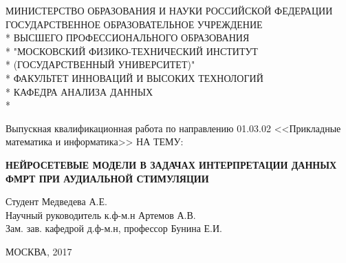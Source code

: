 \documentclass[pdftex,ptm,12pt,a4paper]{report}
\theoremstyle{definition}
\begin{document}
\begin{titlepage}
\newpage

\begin{center}
МИНИСТЕРСТВО ОБРАЗОВАНИЯ И НАУКИ РОССИЙСКОЙ ФЕДЕРАЦИИ \\
\vspace{0.5cm}
ГОСУДАРСТВЕННОЕ ОБРАЗОВАТЕЛЬНОЕ УЧРЕЖДЕНИЕ \\*
ВЫСШЕГО ПРОФЕССИОНАЛЬНОГО ОБРАЗОВАНИЯ\\*
"МОСКОВСКИЙ ФИЗИКО-ТЕХНИЧЕСКИЙ ИНСТИТУТ \\*
(ГОСУДАРСТВЕННЫЙ УНИВЕРСИТЕТ)" \\*
\vspace{0.5cm}
ФАКУЛЬТЕТ ИННОВАЦИЙ И ВЫСОКИХ ТЕХНОЛОГИЙ \\*
КАФЕДРА АНАЛИЗА ДАННЫХ \\*
\hrulefill
\end{center}


\vspace{8em}

\begin{center}
\Large Выпускная квалификационная работа по направлению 01.03.02 <<Прикладные математика и информатика>> \linebreak НА ТЕМУ:
\end{center}

\vspace{2.5em}

\begin{center}
\textsc{\large{\textbf{НЕЙРОСЕТЕВЫЕ МОДЕЛИ В ЗАДАЧАХ ИНТЕРПРЕТАЦИИ ДАННЫХ ФМРТ ПРИ АУДИАЛЬНОЙ СТИМУЛЯЦИИ}}}
\end{center}

\vspace{6.5em}

\begin{flushleft}
Студент \hrulefill Медведева А.Е. \\
\vspace{1.5em}
Научный руководитель к.ф-м.н \hrulefill Артемов А.В.\\
\vspace{1.5em}
Зам. зав. кафедрой д.ф-м.н, профессор \hrulefill Бунина Е.И.
\end{flushleft}

\vspace{\fill}

\begin{center}
МОСКВА, 2017
\end{center}

\end{titlepage}
\end{document}

